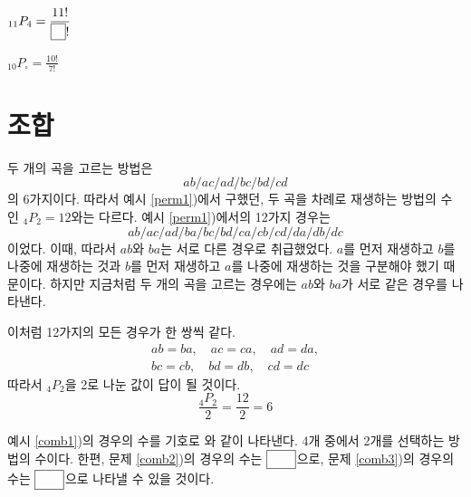 \documentclass{oblivoir}
\begin{document}
%
\label{perm15}
\\[5pt]
\begin{enumerate*}[itemjoin=\tabto{0.5\textwidth}]
\item
\(\displaystyle_{11}P_4=\frac{11!}{\pb{7}!}\)
\item
\(\displaystyle_{10}P_\square=\frac{10!}{7!}\)
\end{enumerate*}


\section{조합}
%
\label{comb1}
\begin{mdframed}
두 개의 곡을 고르는 방법은
\[ab/ac/ad/bc/bd/cd\]
의 6가지이다.
따라서 예시 \ref{perm1})에서 구했던, 두 곡을 차례로 재생하는 방법의 수인  \(_4P_2=12\)와는 다르다.
예시 \ref{perm1})에서의 12가지 경우는
\[ab/ac/ad/ba/bc/bd/ca/cb/cd/da/db/dc\]
이었다.
이때, 따라서 \(ab\)와 \(ba\)는 서로 다른 경우로 취급했었다.
\(a\)를 먼저 재생하고 \(b\)를 나중에 재생하는 것과 \(b\)를 먼저 재생하고 \(a\)를 나중에 재생하는 것을 구분해야 했기 때문이다.
하지만 지금처럼 두 개의 곡을 고르는 경우에는 \(ab\)와 \(ba\)가 서로 같은  경우를 나타낸다.

이처럼 12가지의 모든 경우가 한 쌍씩 같다.
\begin{gather*}
ab=ba,\quad ac=ca,\quad ad=da,\\
bc=cb,\quad bd=db,\quad cd=dc
\end{gather*}
따라서 \(_4P_2\)을 2로 나눈 값이 답이 될 것이다.
\[\frac{_4P_2}{2}=\frac{12}2=6\]
\end{mdframed}

%
\label{comb2}

%
\label{comb3}

\bigskip\bigskip
예시 \ref{comb1})의 경우의 수를 기호로 와 같이 나타낸다.
4개 중에서 2개를 선택하는 방법의 수이다.
한편, 
문제 \ref{comb2})의 경우의 수는 \(\pb{_6C_2}\)으로,
문제 \ref{comb3})의 경우의 수는 \(\pb{_5C_3}\)으로 나타낼 수 있을 것이다.
\end{document}
